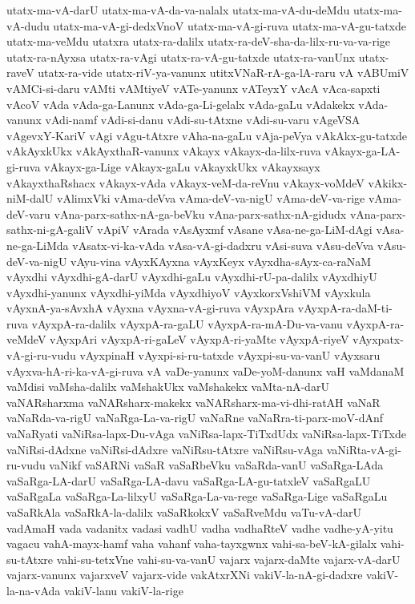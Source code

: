 {utatx-ma-vA-darU
utatx-ma-vA-da-va-nalalx
utatx-ma-vA-du-deMdu
utatx-ma-vA-dudu
utatx-ma-vA-gi-dedxVnoV
utatx-ma-vA-gi-ruva
utatx-ma-vA-gu-tatxde
utatx-ma-veMdu
utatxra
utatx-ra-dalilx
utatx-ra-deV-sha-da-lilx-ru-va-va-rige
utatx-ra-nAyxsa
utatx-ra-vAgi
utatx-ra-vA-gu-tatxde
utatx-ra-vanUnx
utatx-raveV
utatx-ra-vide
utatx-riV-ya-vanunx
utitxVNaR-rA-ga-lA-raru
vA
vABUmiV
vAMCi-si-daru
vAMti
vAMtiyeV
vATe-yanunx
vATeyxY
vAcA
vAca-sapxti
vAcoV
vAda
vAda-ga-Lanunx
vAda-ga-Li-gelalx
vAda-gaLu
vAdakekx
vAda-vanunx
vAdi-namf
vAdi-si-danu
vAdi-su-tAtxne
vAdi-su-varu
vAgeVSA
vAgevxY-KariV
vAgi
vAgu-tAtxre
vAha-na-gaLu
vAja-peVya
vAkAkx-gu-tatxde
vAkAyxkUkx
vAkAyxthaR-vanunx
vAkayx
vAkayx-da-lilx-ruva
vAkayx-ga-LA-gi-ruva
vAkayx-ga-Lige
vAkayx-gaLu
vAkayxkUkx
vAkayxsayx
vAkayxthaRshacx
vAkayx-vAda
vAkayx-veM-da-reVnu
vAkayx-voMdeV
vAkikx-niM-dalU
vAlimxVki
vAma-deVva
vAma-deV-va-nigU
vAma-deV-va-rige
vAma-deV-varu
vAna-parx-sathx-nA-ga-beVku
vAna-parx-sathx-nA-gidudx
vAna-parx-sathx-ni-gA-galiV
vApiV
vArada
vAsAyxmf
vAsane
vAsa-ne-ga-LiM-dAgi
vAsa-ne-ga-LiMda
vAsatx-vi-ka-vAda
vAsa-vA-gi-dadxru
vAsi-suva
vAsu-deVva
vAsu-deV-va-nigU
vAyu-vina
vAyxKAyxna
vAyxKeyx
vAyxdha-sAyx-ca-raNaM
vAyxdhi
vAyxdhi-gA-darU
vAyxdhi-gaLu
vAyxdhi-rU-pa-dalilx
vAyxdhiyU
vAyxdhi-yanunx
vAyxdhi-yiMda
vAyxdhiyoV
vAyxkorxVshiVM
vAyxkula
vAyxnA-ya-sAvxhA
vAyxna
vAyxna-vA-gi-ruva
vAyxpAra
vAyxpA-ra-daM-ti-ruva
vAyxpA-ra-dalilx
vAyxpA-ra-gaLU
vAyxpA-ra-mA-Du-va-vanu
vAyxpA-ra-veMdeV
vAyxpAri
vAyxpA-ri-gaLeV
vAyxpA-ri-yaMte
vAyxpA-riyeV
vAyxpatx-vA-gi-ru-vudu
vAyxpinaH
vAyxpi-si-ru-tatxde
vAyxpi-su-va-vanU
vAyxsaru
vAyxva-hA-ri-ka-vA-gi-ruva
vA‌
vaDe-yanunx
vaDe-yoM-danunx
vaH
vaMdanaM
vaMdisi
vaMsha-dalilx
vaMshakUkx
vaMshakekx
vaMta-nA-darU
vaNARsharxma
vaNARsharx-makekx
vaNARsharx-ma-vi-dhi-ratAH
vaNaR
vaNaRda-va-rigU
vaNaRga-La-va-rigU
vaNaRne
vaNaRra-ti-parx-moV-dAnf
vaNaRyati
vaNiRsa-lapx-Du-vAga
vaNiRsa-lapx-TiTxdUdx
vaNiRsa-lapx-TiTxde
vaNiRsi-dAdxne
vaNiRsi-dAdxre
vaNiRsu-tAtxre
vaNiRsu-vAga
vaNiRta-vA-gi-ru-vudu
vaNikf
vaSARNi
vaSaR
vaSaRbeVku
vaSaRda-vanU
vaSaRga-LAda
vaSaRga-LA-darU
vaSaRga-LA-davu
vaSaRga-LA-gu-tatxleV
vaSaRgaLU
vaSaRgaLa
vaSaRga-La-lilxyU
vaSaRga-La-va-rege
vaSaRga-Lige
vaSaRgaLu
vaSaRkAla
vaSaRkA-la-dalilx
vaSaRkokxV
vaSaRveMdu
vaTu-vA-darU
vadAmaH
vada
vadanitx
vadasi
vadhU
vadha
vadhaRteV
vadhe
vadhe-yA-yitu
vagacu
vahA-mayx-hamf
vaha
vahanf
vaha-tayxgwnx
vahi-sa-beV-kA-gilalx
vahi-su-tAtxre
vahi-su-tetxVne
vahi-su-va-vanU
vajarx
vajarx-daMte
vajarx-vA-darU
vajarx-vanunx
vajarxveV
vajarx-vide
vakAtxrXNi
vakiV-la-nA-gi-dadxre
vakiV-la-na-vAda
vakiV-lanu
vakiV-la-rige
}
